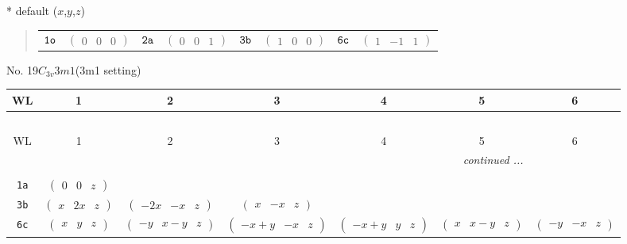 \documentclass[fleqn,9pt,landscape]{jsarticle}
\begin{document}
* default ($x$,$y$,$z$)
\begin{quote}
\begin{tabular}{cccccccc}
$ {\tt 1o} $ & $ \begin{pmatrix} 0 & 0 & 0 \end{pmatrix} $ & $ {\tt 2a} $ & $ \begin{pmatrix} 0 & 0 & 1 \end{pmatrix} $ & $ {\tt 3b} $ & $ \begin{pmatrix} 1 & 0 & 0 \end{pmatrix} $ & $ {\tt 6c} $ & $ \begin{pmatrix} 1 & -1 & 1 \end{pmatrix} $
\end{tabular}
\end{quote}
\newpage
No. 19\quad$C_{3v}$\quad$3m1$\quad(3m1 setting)\quad[ trigonal ]
\begin{center}
\renewcommand{\arraystretch}{1.2}
\begin{longtable}{ccccccc}
 \hline \hline
WL & 1 & 2 & 3 & 4 & 5 & 6 \\ \hline \endfirsthead

\multicolumn{6}{l}{\tablename\ \thetable{}} \\
 \hline \hline
WL & 1 & 2 & 3 & 4 & 5 & 6 \\ \hline \endhead

 \hline \hline
\multicolumn{6}{r}{\footnotesize\it continued ...} \\ \endfoot

 \hline \hline
\multicolumn{6}{r}{} \\ \endlastfoot

{\tt 1a} & $ \begin{pmatrix} 0 & 0 & z \end{pmatrix} $ & $  $ & $  $ & $  $ & $  $ & $  $ \\ \hline
{\tt 3b} & $ \begin{pmatrix} x & 2 x & z \end{pmatrix} $ & $ \begin{pmatrix} - 2 x & - x & z \end{pmatrix} $ & $ \begin{pmatrix} x & - x & z \end{pmatrix} $ & $  $ & $  $ & $  $ \\ \hline
{\tt 6c} & $ \begin{pmatrix} x & y & z \end{pmatrix} $ & $ \begin{pmatrix} - y & x - y & z \end{pmatrix} $ & $ \begin{pmatrix} - x + y & - x & z \end{pmatrix} $ & $ \begin{pmatrix} - x + y & y & z \end{pmatrix} $ & $ \begin{pmatrix} x & x - y & z \end{pmatrix} $ & $ \begin{pmatrix} - y & - x & z \end{pmatrix} $ \\
\end{longtable}
\end{center}
\end{document}
